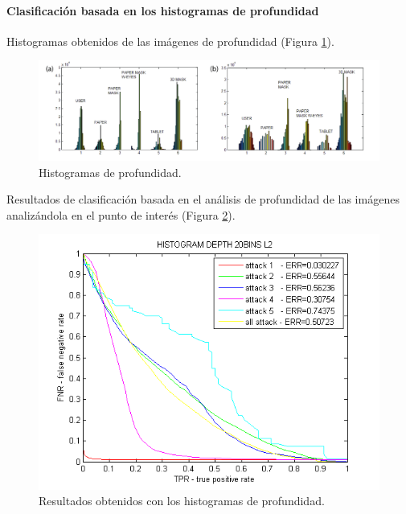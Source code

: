 \paragraph{\textbf{Clasificación basada en los histogramas de profundidad}}

Histogramas obtenidos de las imágenes de profundidad (Figura \ref{fig:HISTOGRAMAS_DE_PROFUNDIDAD}).

\begin{figure}
\centering
\includegraphics[width=1\textwidth]{ch-sistemasABC/images/ch-evaluacion_topologias/HISTOGRAMAS_DE_PROFUNDIDAD.png}
    \caption{Histogramas de profundidad.}
    \label{fig:HISTOGRAMAS_DE_PROFUNDIDAD}
\end{figure}

Resultados de clasificación basada en el análisis de profundidad de las imágenes analizándola en el punto de interés (Figura \ref{fig:RESULTADOS_HISTOGRAMAS_DE_PROFUNDIDAD}).

\begin{figure}
\centering
\includegraphics[width=1\textwidth]{ch-sistemasABC/images/ch-evaluacion_topologias/RESULTADOS_CLASIFICACION_POR_HISTROGRAMAS.png}
    \caption{Resultados obtenidos con los histogramas de profundidad.}
    \label{fig:RESULTADOS_HISTOGRAMAS_DE_PROFUNDIDAD}
\end{figure}

